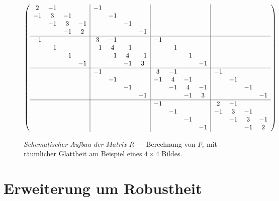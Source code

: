 \begin{figure}
  \begin{center}
\begin{align*}
    \left(
    \begin{array}{cccc|cccc|cccc|cccc}
    2 & -1 &   &    &-1 & & & & & & & & &    \\
    -1 & 3 & -1 &    & &-1 & & & && & & &    \\
    & -1 & 3 & -1    & & & -1 & & & & & & &    \\
    & & -1 & 2      & & & & -1 & & && & & &    \\
    \hline
    -1& & & &       3& -1 & & &     -1& & & &    \\
    & -1& & &       -1&4& -1 & &     &-1& & & &    \\
    & & -1&         & & -1 & 4 & -1& &&-1& & & &    \\    
    & & &-1         & & & -1 & 3 &  &&&-1& & & &    \\
    \hline
    & & & &    -1& & & &       3& -1 & & &     -1\\
    & & & &    & -1& & &       -1&4& -1 & &     &-1\\
    & & & &    & & -1&         & & -1 & 4 & -1& &&-1\\    
    & & & &    & & &-1         & & & -1 & 3 &  &&&-1\\
    \hline
    & & & &    & & & &    -1& & & &       2& -1\\
    & & & &    & & & &    & -1& & &       -1&3& -1\\
    & & & &    & & & &    & & -1&         & & -1 & 3 & -1\\    
    & & & &    & & & &    & & &-1         & & & -1 & 2\\
    \end{array}
    \right)
\end{align*}
\end{center}
\caption{\textit{Schematischer Aufbau der Matrix $R$} --- Berechnung von $F_i$ mit räumlicher Glattheit am Beispiel eines $4 \times 4$ Bildes.}
\label{fig:raum:matrix}
\end{figure}


\section{Erweiterung um Robustheit}
\label{sec:robustheit}

